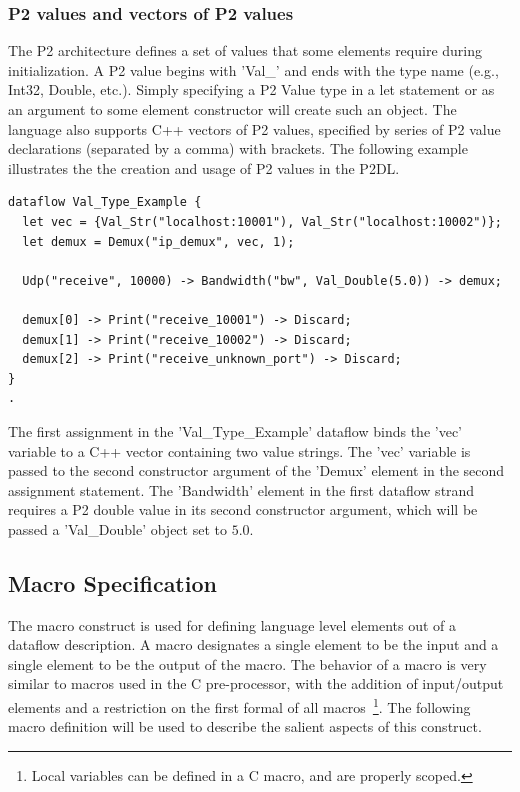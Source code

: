 \documentclass[12pt]{article}
\begin{document}
\subsubsection{P2 values and vectors of P2 values}
\label{sec:p2values}

The P2 architecture defines a set of values that some elements require during
initialization. A P2 value begins with 'Val\_' and ends with the type name 
(e.g., Int32, Double, etc.). Simply specifying a P2 Value type in a let statement
or as an argument to some element constructor will create such an object. The language 
also supports C++ vectors of P2 values, specified by series of P2 value declarations (separated by
a comma) with brackets. The following example illustrates the the creation 
and usage of P2 values in the P2DL.

\begin{verbatim}
dataflow Val_Type_Example {
  let vec = {Val_Str("localhost:10001"), Val_Str("localhost:10002")};
  let demux = Demux("ip_demux", vec, 1);

  Udp("receive", 10000) -> Bandwidth("bw", Val_Double(5.0)) -> demux;

  demux[0] -> Print("receive_10001") -> Discard;
  demux[1] -> Print("receive_10002") -> Discard;
  demux[2] -> Print("receive_unknown_port") -> Discard;
}
.
\end{verbatim}

The first assignment in the 'Val\_Type\_Example' dataflow binds the 'vec' variable to 
a C++ vector containing two value strings. The 'vec' variable is passed to the 
second constructor argument of the 'Demux' element in the second assignment statement.
The 'Bandwidth' element in the first dataflow strand requires a P2 double value in
its second constructor argument, which will be passed a 'Val\_Double' object set
to $5.0$.

\subsection{Macro Specification}

The macro construct is used for defining language level elements out of a dataflow
description. A macro designates a single element to be the input and a single element
to be the output of the macro. The behavior of a macro is very similar to macros used 
in the C pre-processor, 
with the addition of input/output elements and a restriction on the first formal of all 
macros~\footnote{Local variables can be defined in a C macro, and are properly scoped.}.
The following macro definition will be used to describe the salient aspects of this
construct.
\end{document}
